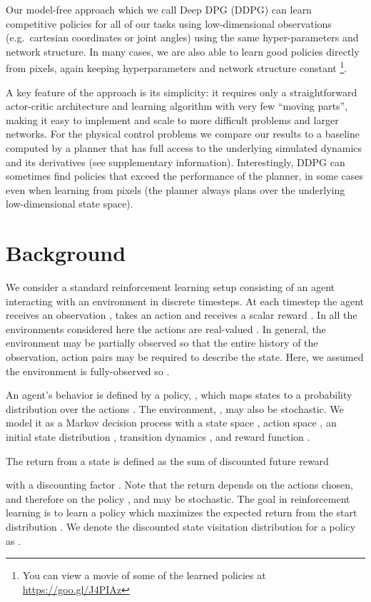 \documentclass{article} \usepackage{iclr2016_conference,times}
\begin{document}
Our model-free approach which we call
Deep DPG (DDPG) can learn competitive policies for
all of our tasks
using low-dimensional observations
(e.g.\ cartesian coordinates or
joint angles) using the same hyper-parameters and
network structure.
In many cases, we are also able to learn good policies directly
from pixels, again keeping hyperparameters and
network structure constant \footnote{You can view a movie of some
of the learned policies at \url{https://goo.gl/J4PIAz}}.

A key feature of the approach is its simplicity: it requires
only a straightforward actor-critic architecture and learning
algorithm with very few ``moving parts'', making it easy to implement and
scale to more difficult problems and larger networks.  For the
physical control problems we compare our results to a baseline
computed by a planner \citep{tassa2012synthesis} that has full access
to the underlying simulated dynamics and its derivatives (see
supplementary information).  Interestingly, DDPG can sometimes find
policies that exceed the performance of the planner, in some cases
even when learning from pixels (the planner always plans over the
underlying low-dimensional state space).



\section{Background}

We consider a standard reinforcement learning setup consisting of an
agent interacting with an environment  in discrete timesteps. At
each timestep  the agent receives an observation ,
takes an action  and receives a scalar reward .
In all the environments considered here the actions are real-valued
.
In general, the environment may be
partially observed so that the entire history of the observation, action
pairs 
may be required to describe the state. Here, we
assumed the environment is fully-observed so
 .

An agent's behavior is defined by a policy, , which maps states
to a probability distribution over the actions . The environment, , may also be
stochastic.  We model it as a Markov decision process with a state
space , action space , an initial
state distribution , transition dynamics , and reward function .

The return from a state is defined as the sum of discounted future reward

with a discounting factor
. Note that the return depends on the actions
chosen, and therefore on the policy , and may be stochastic.
The goal in reinforcement learning is
to learn a policy which maximizes the expected return from the start
distribution . We
denote the discounted state
visitation distribution for a policy  as .
\end{document}
